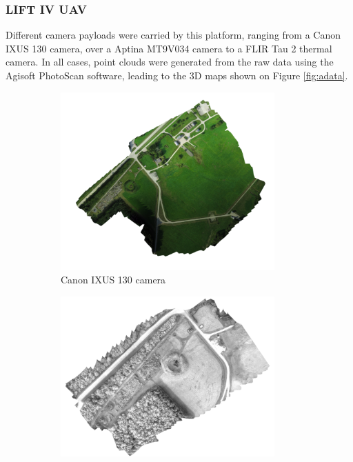\documentclass{article}
\begin{document}
\subsubsection{LIFT IV UAV}
Different camera payloads were carried by this platform, ranging from a Canon IXUS 130 camera, over a Aptina MT9V034 camera to a FLIR Tau 2 thermal camera. In all cases, point clouds were generated from the raw data using the Agisoft PhotoScan software, leading to the 3D maps shown on Figure \ref{fig:adata}.
\begin{figure} [h]
    \centering
    \begin{subfigure} [b]{0.49\textwidth}
         \centering
         \includegraphics[width=0.9\textwidth]{ROB-15-0035_fig25a.png}
         \caption{Canon IXUS 130 camera}
         \label{fig:ad1}
    \end{subfigure}%
    \begin{subfigure} [b]{0.49\textwidth}
         \centering
         \includegraphics[width=0.9\textwidth]{ROB-15-0035_fig25b.png}

\end{subfigure}
\end{figure}
\end{document}
